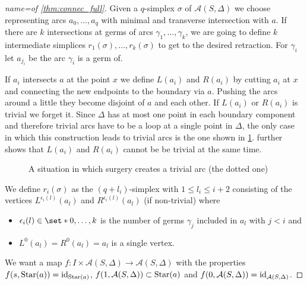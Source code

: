 \begin{proof}[{name={of \autoref{thm:connec_full}}}]
	Given a $q$-simplex $\sigma$ of $\mathcal{A}(S,\Delta)$ we choose representing arcs $a_0, \ldots ,a_q$ with minimal and transverse intersection with $a$.
	If there are $k$ intersections at germs of arcs $\gamma_1, \ldots ,\gamma_k$, we are going to define $k$ intermediate simplices $r_1(\sigma), \ldots ,r_k(\sigma)$ to get to the desired retraction.
	For $\gamma_i$ let $a_{j_i}$ be the arc $\gamma_i$ is a germ of.

	If $a_i$ intersects $a$ at the point $x$ we define $L(a_i)$ and $R(a_i)$ by cutting $a_i$ at $x$ and connecting the new endpoints to the boundary via $a$.
	Pushing the arcs around a little they become disjoint of $a$ and each other.
	If $L(a_i)$ or $R(a_i)$ is trivial we forget it.
	Since $\Delta$ has at most one point in each boundary component and therefore trivial arcs have to be a loop at a single point in $\Delta$, the only case in which this construction leads to trivial arcs is the one shown in \cref{fig:surg_trivial}.
	 further shows that $L(a_i)$ and $R(a_i)$ cannot be be trivial at the same time.
	\begin{figure}[hbt]
		\centering
		\caption{A situation in which surgery creates a trivial arc (the dotted one)}\label{fig:surg_trivial}
	\end{figure}
	
	We define $r_i(\sigma)$ as the $(q+ l_i)$-simplex with $1 \le l_i \le i + 2$ consisting of the vertices $L^{\epsilon_i(l)}(a_l)$ and $R^{\epsilon_i(l)}(a_l)$ (if non-trivial)  where 
	\begin{itemize}
		\item $\epsilon_i(l) \in \set*{0, \ldots ,k}$ is the number of germs $\gamma_j$ included in $a_l$ with $j < i$ and
		\item $L^0(a_l)=R^0(a_l)=a_l$ is a single vertex.
	\end{itemize}
	We want a map $f \colon I \times \mathcal{A}(S,\Delta) \to \mathcal{A}(S,\Delta)$ with the properties $f(s,\operatorname{Star}(a)) = \operatorname{id}_{\operatorname{Star}(a)}$, $f(1,\mathcal{A}(S,\Delta)) \subset \operatorname{Star}(a)$ and $f(0,\mathcal{A}(S,\Delta)) = \operatorname{id}_{\mathcal{A}(S,\Delta)}$.
	
\end{proof}

